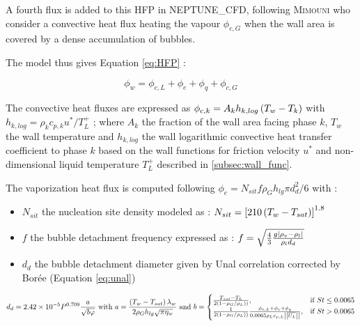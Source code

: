 A fourth flux is added to this HFP in NEPTUNE\_CFD, following \textsc{Mimouni} \etal\cite{mimouni2016} who consider a convective heat flux heating the vapour $\phi_{c,G}$ when the wall area is covered by a dense accumulation of bubbles.

The model thus gives Equation \ref{eq:HFP} :

\begin{equation}
\label{eq:HFP}
\phi_{w}=\phi_{c,L}+\phi_{e}+\phi_{q}+\phi_{c,G}
\end{equation}

The convective heat fluxes are expressed as $\phi_{c,k}=A_{k}h_{k,log}\left( T_{w}-T_{k} \right)$ with $ h_{k,log}=\rho_{k}c_{p,k}{u^{*}}/{T_{L}^{+}}$ ; where $A_{k}$ the fraction of the wall area facing phase $k$, $T_{w}$ the wall temperature and $h_{k,log}$ the wall logarithmic convective heat transfer coefficient to phase $k$ based on the wall functions for friction velocity $u^{*}$ and non-dimensional liquid temperature $T_{L}^{+}$ described in \ref{subsec:wall_func}.

The vaporization heat flux is computed following $\phi_{e}=N_{sit}f\rho_{G}h_{lg}{\pi d_{d}^{2}}/{6}$ with :
\begin{itemize}
\item $N_{sit}$ the nucleation site density modeled as \cite{lemmert1977} : $N_{sit}=\left[ 210\left( T_{w}-T_{sat} \right)  \right]^{1.8}$
\item $f$ the bubble detachment frequency expressed as \cite{cole1960} : $f=\sqrt{\frac{4}{3}\frac{g\left| \rho_{v}-\rho_{l} \right| }{\rho_{l}d_{d}}}$
\item $d_{d}$ the bubble detachment diameter given by Unal correlation\cite{unal1976} corrected by Bor\'ee \etal[ref] (Equation \ref{eq:unal})
\end{itemize}

\begin{equation}
\label{eq:unal}
d_{d}=2.42\times 10^{-5} P^{0.709} \frac{a}{\sqrt{b\varphi}}\text{ with } a=\frac{\left( T_{w}-T_{sat} \right) \lambda_{w}}{2\rho_{G}h_{lg}\sqrt{\pi\eta_{w}}} \text{ and } 
  b=\begin{cases}
    \frac{T_{sat}-T_{L}}{2 \left( 1-\rho_{G}/\rho_{L}  \right))}, & \text{if $St\leq0.0065$}\\
    \frac{1}{2 \left( 1-\rho_{G}/\rho_{L}  \right))}\frac{\phi_{c,L}+\phi_{e}+\phi_{q}}{0.0065\rho_{L}c_{p,L}\left|\left|{\overline{U_{L}}}\right|\right|}, & \text{\text{if $St>0.0065$}}
  \end{cases}
\end{equation}

